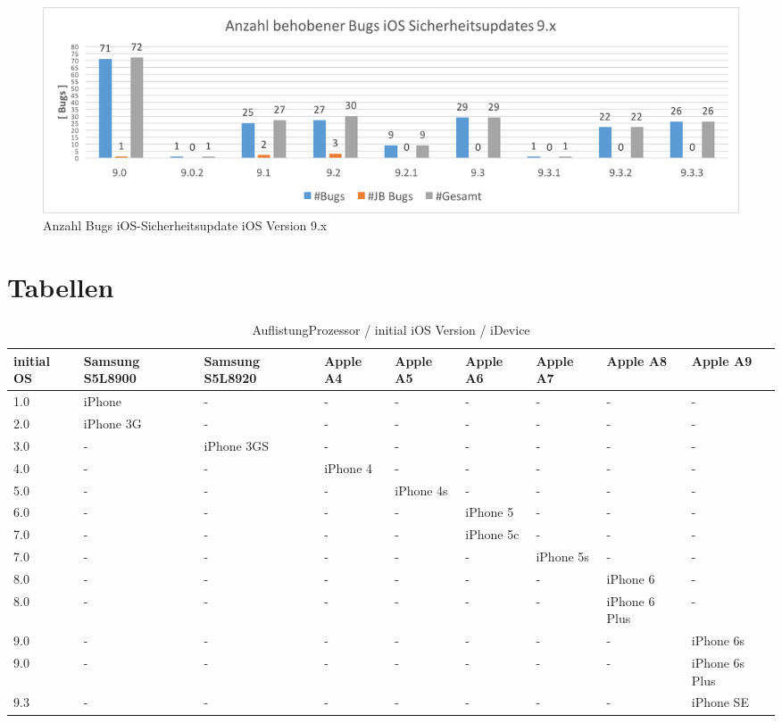 \begin{figure}[hp!]
        \centering
                \includegraphics[scale=0.55]{Bilder/iOSSicherheitsupdate9.png}
        \caption{Anzahl Bugs iOS-Sicherheitsupdate iOS Version 9.x \protect\footnotemark}
        \label{fig:AnalyseiOSSicherheitsupdate9}
\end{figure}


\newpage
\chapter{Tabellen}
\begin{table}[htp!]
    \begin{center}
        \begin{tabular}{| p{8mm} | p{18mm} | p{18mm} | p{15mm} | p{15mm} | p{15mm} | p{15mm} | p{15mm} | p{15mm} |} \hline
\textbf{initial OS} & \textbf{Samsung S5L8900} & \textbf{Samsung S5L8920} & \textbf{Apple A4}	& \textbf{Apple A5}	& \textbf{Apple A6} & \textbf{Apple A7} & \textbf{Apple A8} & \textbf{Apple A9} \\ \hline
1.0 & iPhone & - & - &  - &  - & - &  - & - \\ \hline		
2.0 & iPhone 3G & - & - &  - &  - & - &  - & - \\ \hline				
3.0 & - & iPhone 3GS & - &  - &  - & - &  - & -	\\ \hline			
4.0 & - &  - & iPhone 4	 &  - &  - & - &  - & -	\\ \hline		
5.0 &  - & - &  - &	iPhone 4s &  - & - &  - & - \\ \hline		
6.0 &  - &  - & - &  - & iPhone 5 & - &  - & -	\\ \hline	
7.0 &  - &  - & - &  - & iPhone 5c	& - &  - & - \\ \hline	
7.0 & - &  - &  - & - &  - & iPhone 5s &  - & - \\ \hline
8.0 & - & - &  - &  - & - &  - & iPhone 6 & - \\ \hline
8.0 & - & - &  - &  - & - &  - & iPhone 6 Plus & -\\ \hline
9.0 & - & - &  - &  - & - &  - & - & iPhone 6s \\ \hline
9.0 & - & - &  - &  - & - &  - & - & iPhone 6s Plus \\ \hline
9.3 & - & - &  - &  - & - &  - & - & iPhone SE \\ \hline     
        \end{tabular} 
        \caption{AuflistungProzessor / initial iOS Version / iDevice  }
        \label{tab:AuflistungProziOSVersioniDevice}
    \end{center}
\end{table}

